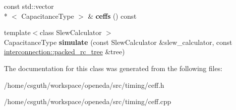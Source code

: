 \begin{DoxyCompactItemize}
\item 
\hypertarget{classophidian_1_1timing_1_1lumped__capacitance__wire__model_ac63abe81bdfcf64c003656218d5cb165}{const std\-::vector\\*
$<$ Capacitance\-Type $>$ \& {\bfseries ceffs} () const }\label{classophidian_1_1timing_1_1lumped__capacitance__wire__model_ac63abe81bdfcf64c003656218d5cb165}

\item 
\hypertarget{classophidian_1_1timing_1_1lumped__capacitance__wire__model_a517086ee6654ea876183d5fa6d2d4f51}{{\footnotesize template$<$class Slew\-Calculator $>$ }\\Capacitance\-Type {\bfseries simulate} (const Slew\-Calculator \&slew\-\_\-calculator, const \hyperlink{classophidian_1_1interconnection_1_1packed__rc__tree}{interconnection\-::packed\-\_\-rc\-\_\-tree} \&tree)}\label{classophidian_1_1timing_1_1lumped__capacitance__wire__model_a517086ee6654ea876183d5fa6d2d4f51}

\end{DoxyCompactItemize}


The documentation for this class was generated from the following files\-:\begin{DoxyCompactItemize}
\item 
/home/csguth/workspace/openeda/src/timing/ceff.\-h\item 
/home/csguth/workspace/openeda/src/timing/ceff.\-cpp\end{DoxyCompactItemize}
